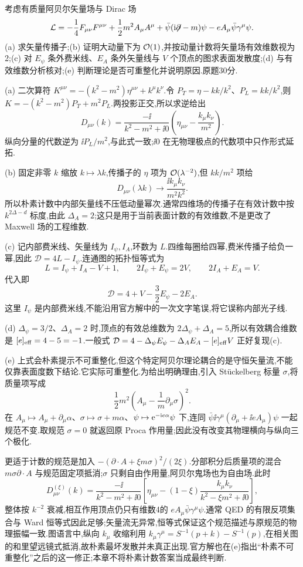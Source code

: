 \begin{exercise}
考虑有质量阿贝尔矢量场与 Dirac 场
\[
\mathcal L=-\frac14F_{\mu\nu}F^{\mu\nu}+\frac12m^2A_\mu A^\mu
+\bar\psi(\mathrm i\mathord{\not\mathrel{\partial}}-m)\psi-eA_\mu\bar\psi\gamma^\mu\psi.
\]
(a) 求矢量传播子;(b) 证明大动量下为 $\mathcal O(1)$,并按动量计数将矢量场有效维数视为2;(c) 对 $E_\psi$ 条外费米线、$E_A$ 条外矢量线与 $V$ 个顶点的图求表面发散度;(d) 与有效维数分析核对;(e) 判断理论是否可重整化并说明原因.原题30分.
\end{exercise}
\begin{solution}
(a) 二次算符 $K^{\mu\nu}=-(k^2-m^2)\eta^{\mu\nu}+k^\mu k^\nu$.令 $P_T=\eta-kk/k^2$、$P_L=kk/k^2$,则 $K=-(k^2-m^2)P_T+m^2P_L$.两投影正交,所以求逆给出
\[
D_{\mu\nu}(k)=\frac{-\ii}{k^2-m^2+\ii0}
\left(\eta_{\mu\nu}-\frac{k_\mu k_\nu}{m^2}\right).
\]
纵向分量的代数逆为 $\ii P_L/m^2$,与此式一致;$\ii0$ 在无物理极点的代数项中只作形式延拓.

(b) 固定非零 $k$ 缩放 $k\mapsto\lambda k$,传播子的 $\eta$ 项为 $\mathcal O(\lambda^{-2})$,但 $kk/m^2$ 项给
\[
D_{\mu\nu}(\lambda k)\longrightarrow
\frac{\ii k_\mu k_\nu}{m^2k^2}.
\]
所以朴素计数中内部矢量线不压低动量幂次.通常四维场的传播子在有效计数中按 $k^{2\Delta-d}$ 标度,由此 $\Delta_A=2$;这只是用于当前表面计数的有效维数,不是更改了 Maxwell 场的工程维数.

(c) 记内部费米线、矢量线为 $I_\psi,I_A$,环数为 $L$.四维每圈给四幂,费米传播子给负一幂,因此 $\mathcal D=4L-I_\psi$.连通图的拓扑恒等式为
\[
L=I_\psi+I_A-V+1,
\qquad 2I_\psi+E_\psi=2V,
\qquad 2I_A+E_A=V.
\]
代入即
\[
\mathcal D=4+V-\frac32E_\psi-2E_A.
\]
这里 $I_\psi$ 是内部费米线,不能沿用官方解中的一次文字笔误,将它误称内部光子线.

(d) $\Delta_\psi=3/2$、$\Delta_A=2$ 时,顶点的有效总维数为 $2\Delta_\psi+\Delta_A=5$,所以有效耦合维数是 $[e]_{\rm eff}=4-5=-1$.一般式 $\mathcal D=4-\Delta_\psi E_\psi-\Delta_AE_A-[e]_{\rm eff}V$ 正好复现(c).

(e) 上式会朴素提示不可重整化,但这个特定阿贝尔理论耦合的是守恒矢量流,不能仅靠表面度数下结论.它实际可重整化.为给出明确理由,引入 Stückelberg 标量 $\sigma$,将质量项写成
\[
\frac12m^2\left(A_\mu-\frac1m\partial_\mu\sigma\right)^2.
\]
在 $A_\mu\mapsto A_\mu+\partial_\mu\alpha$、$\sigma\mapsto\sigma+m\alpha$、$\psi\mapsto\mathrm e^{-\mathrm i e\alpha}\psi$ 下,连同 $\bar\psi\ii\gamma^\mu(\partial_\mu+\ii eA_\mu)\psi$ 一起规范不变.取规范 $\sigma=0$ 就返回原 Proca 作用量;因此没有改变其物理横向与纵向三个极化.

更适于计数的规范是加入 $-(\partial\cdot A+\xi m\sigma)^2/(2\xi)$.分部积分后质量项的混合 $m\sigma\partial\cdot A$ 与规范固定项抵消;$\sigma$ 只剩自由作用量,阿贝尔鬼场也为自由场.此时
\[
D_{\mu\nu}^{(\xi)}(k)=\frac{-\ii}{k^2-m^2+\ii0}
\left[\eta_{\mu\nu}-(1-\xi)\frac{k_\mu k_\nu}{k^2-\xi m^2+\ii0}\right],
\]
整体按 $k^{-2}$ 衰减,相互作用顶点仍只有维数4的 $eA_\mu\bar\psi\gamma^\mu\psi$.通常 QED 的有限反项集合与 Ward 恒等式因此足够;矢量流无异常,恒等式保证这个规范描述与原规范的物理振幅一致.图语言中,纵向 $k_\mu$ 收缩利用 $k_\mu\gamma^\mu=S^{-1}(p+k)-S^{-1}(p)$,在相关图的和里望远镜式抵消,故朴素最坏发散并未真正出现.官方解也在(e)指出“朴素不可重整化”之后的这一修正;本章不将朴素计数答案当成最终判断.
\end{solution}

